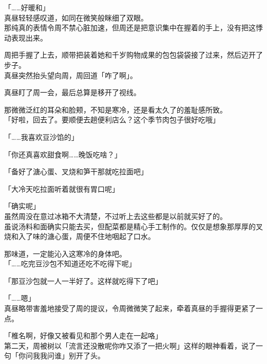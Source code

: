 「……好暖和」\\

真昼轻轻感叹道，如同在微笑般眯细了双眼。\\

那纯真的表情令周不禁心脏加速，但周还是把意识集中在握着的手上，没有把这悸动表现出来。

周把手握了上去，顺带把装着她和千岁购物成果的包包袋袋接了过来，然后迈开了步子。\\

真昼突然抬头望向周，周回道「咋了啊」。

真昼盯了周一会，最后总算是移开了视线。

那微微泛红的耳朵和脸颊，不知是寒冷，还是看太久了的羞耻感所致。\\

「好啦，回去了。要顺便去趟便利店么？这个季节肉包子很好吃哦」

「……我喜欢豆沙馅的」

「你还真喜欢甜食啊……晚饭吃啥？」

「备好了溏心蛋、叉烧和笋干那就吃拉面吧」

「大冷天吃拉面听着就很有胃口呢」

「确实呢」\\

虽然周没在意过冰箱不大清楚，不过听上去这些都是以前就买好了的。\\

虽说汤料和面确实只能去买，但配菜都是精心手工制作的。仅仅是想象那厚厚的叉烧和入了味的溏心蛋，周便不住地咽起了口水。

那味道，一定能沁入这寒冷的身体吧。\\

「……吃完豆沙包不知道还吃不吃得下呢」

「那豆沙包就一人一半好了。这样就吃得下了吧」

「……嗯」\\

真昼略带害羞地接受了周的提议，令周微微笑了起来，牵着真昼的手握得更紧了一点。\\

\vspace{2\baselineskip}

「椎名啊，好像又被看见和那个男人走在一起咯」\\

第二天，周被树以「流言还没散呢你咋又添了一把火啊」这样的眼神看着，说了一句「你问我我问谁」别开了头。
